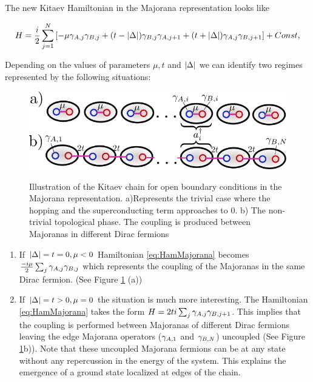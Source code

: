 The new Kitaev Hamiltonian in the Majorana representation looks like 

\begin{equation}
H = \frac{i}{2} \sum_{j=1}^N \left[ -\mu \gamma_{A,j}\gamma_{B,j}  + (t- \vert \Delta \vert) \gamma_{B,j}\gamma_{A,j+1} + (t+ \vert \Delta \vert) \gamma_{A,j}\gamma_{B,j+1} \right]+Const,\label{eq:HamMajorana}
\end{equation}

Depending on the values of parameters $\mu, t$ and $\vert \Delta \vert$ we can identify two regimes represented by the following situations:



\begin{figure}[hbt]
    \centering
    \includegraphics[scale=0.5]{IMAGES/Majorana/KitaevChain.png}
    \label{fig:top.phases kitaev}
    \caption{Illustration of the Kitaev chain for open boundary conditions in the Majorana representation. a)Represents the trivial case where the hopping and the superconducting term approaches to $0$. b) The non-trivial topological phase. The coupling is produced between Majoranas in different Dirac fermions \protect{} }
\end{figure}


\begin{enumerate}
\item{If $\vert \Delta \vert = t = 0, \mu <0$} Hamiltonian \eqref{eq:HamMajorana} becomes $\frac{-i\mu}{2} \sum_{j} \gamma_{A,j}\gamma_{B,j}$ which represents the coupling of the Majoranas in the same Dirac fermion. (See Figure \ref{fig:top.phases kitaev} (a))

\item{If $\vert \Delta \vert = t > 0, \mu =0$} the situation is much more interesting. The Hamiltonian \eqref{eq:HamMajorana} takes the form $H = 2ti\sum_{j} \gamma_{A,j}\gamma_{B,j+1}$. This implies that the coupling is performed between  Majoranas of different Dirac fermions leaving the edge Majorana operators ($\gamma_{A,1}$ and $\gamma_{B,N}$) uncoupled (See Figure \ref{fig:top.phases kitaev}b)). Note that these uncoupled Majorana fermions can be at any state without any  repercussion in the energy of the system. This explains the emergence of a  ground state localized at edges of the chain. 
\end{enumerate}

